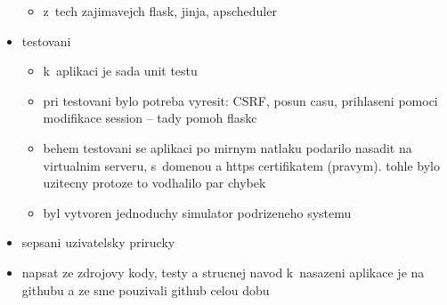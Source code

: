 \begin{itemize}
\begin{itemize}
        \item z~tech zajimavejch flask, jinja, apscheduler
    \end{itemize}
    \item testovani
    \begin{itemize}
        \item k~aplikaci je sada unit testu
        \item pri testovani bylo potreba vyresit: CSRF, posun casu, prihlaseni pomoci modifikace session -- tady pomoh flaskc
        \item behem testovani se aplikaci po mirnym natlaku podarilo nasadit na virtualnim serveru, s~domenou a https certifikatem (pravym). tohle bylo uzitecny protoze to vodhalilo par chybek
        \item byl vytvoren jednoduchy simulator podrizeneho systemu
    \end{itemize}
    \item sepsani uzivatelsky prirucky
    \item napsat ze zdrojovy kody, testy a strucnej navod k~nasazeni aplikace je na githubu a ze sme pouzivali github celou dobu
\end{itemize}
